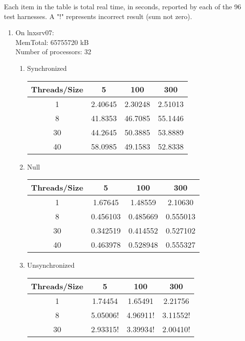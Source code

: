 \documentclass[letterpaper,twocolumn,10pt]{article}
\begin{document}
Each item in the table is total real time, in seconds, reported by each of the 96 test harnesses.
A "!" represents incorrect result (sum not zero).
\begin{enumerate}
  \item   
  On lnxsrv07: \\
  MemTotal:       65755720 kB \\
  Number of processors: 32 \\
  \begin{enumerate}
    \item 
    Synchronized
    \begin{center}
      \begin{tabular}{|c|c|c|c|}
      \hline
        Threads/Size & 5 & 100 & 300 \\
      \hline 1 & 2.40645 & 2.30248 & 2.51013 \\
      \hline 8 & 41.8353 & 46.7085 & 55.1446 \\
      \hline 30 & 44.2645 & 50.3885 & 53.8889 \\
      \hline 40 & 58.0985 & 49.1583 & 52.8338 \\
      \hline
      \end{tabular}
    \end{center}
    \item 
    Null
    \begin{center}
      \begin{tabular}{|c|c|c|c|}
      \hline
        Threads/Size & 5 & 100 & 300 \\
      \hline 1 & 1.67645 & 1.48559 & 2.10630 \\
      \hline 8 & 0.456103 & 0.485669 & 0.555013 \\
      \hline 30 & 0.342519 & 0.414552 & 0.527102 \\
      \hline 40 & 0.463978 & 0.528948 & 0.555327 \\
      \hline
      \end{tabular}
    \end{center}
    \item 
    Unsynchronized
    \begin{center}
      \begin{tabular}{|c|c|c|c|}
      \hline
        Threads/Size & 5 & 100 & 300 \\
      \hline 1 & 1.74454 & 1.65491 & 2.21756 \\
      \hline 8 & 5.05006! & 4.96911! & 3.11552! \\
      \hline 30 & 2.93315! & 3.39934! & 2.00410! \\

\end{tabular}
\end{center}
\end{enumerate}
\end{enumerate}
\end{document}
